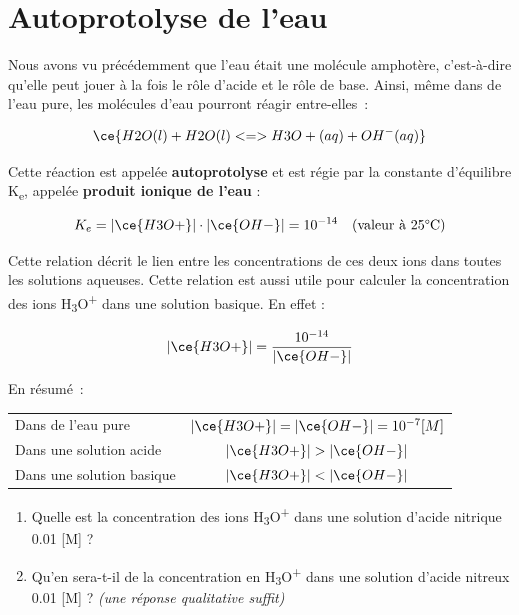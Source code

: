 \documentclass[
  11pt,
  french,
  a4paper,
  openany]{book}
\providecommand{\tightlist}{%
  \setlength{\itemsep}{0pt}\setlength{\parskip}{0pt}}
\begin{document}
\clearpage

\hypertarget{autoprotolyse-de-leau}{%
\section{Autoprotolyse de l'eau}\label{autoprotolyse-de-leau}}

Nous avons vu précédemment que l'eau était une molécule amphotère, c'est-à-dire qu'elle peut jouer à la fois le rôle d'acide et le rôle de base. Ainsi, même dans de l'eau pure, les molécules d'eau pourront réagir entre-elles~:

\[
\ce{H2O(l) + H2O(l) <=> H3O+(aq) + OH^{-}(aq)}
\]

Cette réaction est appelée \textbf{autoprotolyse} et est régie par la constante d'équilibre K\textsubscript{e}, appelée \textbf{produit ionique de l'eau} :

\[
K_e = |\ce{H3O+}| \cdot |\ce{OH-}| = 10^{-14} \quad \text{(valeur à 25°C)}
\]

Cette relation décrit le lien entre les concentrations de ces deux ions dans toutes les solutions aqueuses. Cette relation est aussi utile pour calculer la concentration des ions H\textsubscript{3}O\textsuperscript{+} dans une solution basique. En effet :

\[
|\ce{H3O+}| = \frac{10^{-14}}{|\ce{OH-}|}
\]

En résumé~:

\begin{longtable}[]{@{}lc@{}}
\toprule
\endhead
Dans de l'eau pure & \(|\ce{H3O+}| = |\ce{OH-}| = 10^{-7} [M]\)\tabularnewline
Dans une solution acide & \(|\ce{H3O+}| > |\ce{OH-}|\)\tabularnewline
Dans une solution basique & \(|\ce{H3O+}| < |\ce{OH-}|\)\tabularnewline
\bottomrule
\end{longtable}

\begin{Exercise}

\begin{enumerate}
\def\labelenumi{\alph{enumi}.}
\tightlist
\item
  Quelle est la concentration des ions H\textsubscript{3}O\textsuperscript{+} dans une solution d'acide nitrique 0.01 {[}M{]} ?
\item
  Qu'en sera-t-il de la concentration en H\textsubscript{3}O\textsuperscript{+} dans une solution d'acide nitreux 0.01 {[}M{]} ?
  \emph{(une réponse qualitative suffit)}
\end{enumerate}


\end{Exercise}
\end{document}

